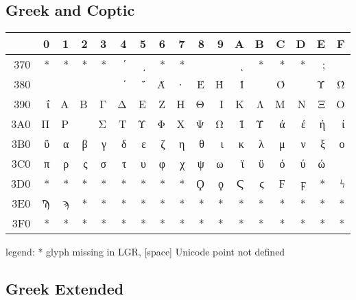 \documentclass[a4paper]{scrartcl}
\begin{document}
\subsection{Greek and Coptic}

\begin{tabular}{rrrrrrrrrrrrrrrrr}
\toprule
    & 0 & 1 & 2 & 3 & 4 & 5 & 6 & 7 & 8 & 9 & A & B & \textlatin C & D & E & F\\
\midrule
\textlatin{370} & * & * & * & * & ʹ & ͵ & * & * &   &   & ͺ & * & * & * & ; &  \\
\textlatin{380} &   &   &   &   & ΄ & ΅ & Ά & · & Έ & Ή & Ί &   & Ό &   & Ύ & Ώ\\
\textlatin{390} & ΐ & Α & Β & Γ & Δ & Ε & Ζ & Η & Θ & Ι & Κ & Λ & Μ & Ν & Ξ & Ο\\
\textlatin{3A0} & Π & Ρ &   & Σ & Τ & Υ & Φ & Χ & Ψ & Ω & Ϊ & Ϋ & ά & έ & ή & ί\\
\textlatin{3B0} & ΰ & α & β & γ & δ & ε & ζ & η & θ & ι & κ & λ & μ & ν & ξ & ο\\
\textlatin{3C0} & π & ρ & ς & σ & τ & υ & φ & χ & ψ & ω & ϊ & ϋ & ό & ύ & ώ &  \\
\textlatin{3D0} & * & * & * & * & * & * & * & * & Ϙ & ϙ & Ϛ & ϛ & Ϝ & ϝ & * & ϟ\\
\textlatin{3E0} & Ϡ & ϡ & * & * & * & * & * & * & * & * & * & * & * & * & * & *\\
\textlatin{3F0} & * & * & * & * & * & * & * & * & * & * & * & * & * & * & * & *\\
\bottomrule
\end{tabular}

 \noindent
legend: * glyph missing in LGR, [space] Unicode point not defined


\subsection{Greek Extended}
\end{document}
